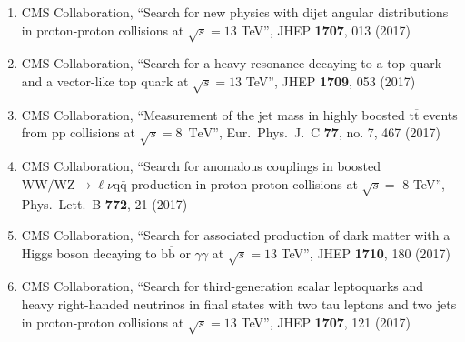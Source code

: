 \begin{enumerate}
\item CMS Collaboration, ``Search for new physics with dijet angular distributions in proton-proton collisions at $ \sqrt{s}=13 $ TeV'', JHEP {\bf 1707}, 013 (2017)

\item CMS Collaboration, ``Search for a heavy resonance decaying to a top quark and a vector-like top quark at $ \sqrt{s}=13 $ TeV'', JHEP {\bf 1709}, 053 (2017)

\item CMS Collaboration, ``Measurement of the jet mass in highly boosted ${\mathrm{t}}\overline{\mathrm{t}}$ events from pp collisions at $\sqrt{s}=8$ $\,\text {TeV}$'', Eur.\ Phys.\ J.\ C {\bf 77}, no. 7, 467 (2017)

\item CMS Collaboration, ``Search for anomalous couplings in boosted $\mathrm{ WW/WZ }\to\ell\nu\mathrm{ q \bar{q} }$ production in proton-proton collisions at $\sqrt{s} =$ 8 TeV'', Phys.\ Lett.\ B {\bf 772}, 21 (2017)

\item CMS Collaboration, ``Search for associated production of dark matter with a Higgs boson decaying to $ \mathrm{b}\overline{\mathrm{b}} $ or $\gamma \gamma$ at $ \sqrt{s}=13$ TeV'', JHEP {\bf 1710}, 180 (2017)

\item CMS Collaboration, ``Search for third-generation scalar leptoquarks and heavy right-handed neutrinos in final states with two tau leptons and two jets in proton-proton collisions at $ \sqrt{s}=13 $ TeV'', JHEP {\bf 1707}, 121 (2017)


\end{enumerate}
